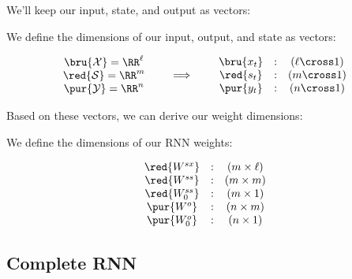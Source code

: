         We'll keep our input, state, and output as vectors:\\

        \begin{definition}
            We define the dimensions of our input, output, and state as vectors:

            \begin{equation*}
                \begin{matrix}
                    \bru{\mathcal{X}} = \RR^\ell \\
                    \red{\mathcal{S}} = \RR^m    \\
                    \pur{\mathcal{Y}} = \RR^n
                \end{matrix}
                \qquad\implies\qquad 
                \begin{matrix}
                    \bru{x_t} &:& (\ell \cross 1) \\
                    \red{s_t} &:& (m \cross 1)    \\
                    \pur{y_t} &:& (n \cross 1)
                \end{matrix}
            \end{equation*} 
        \end{definition}

        Based on these vectors, we can derive our weight dimensions:\\

        \begin{definition}
            We define the dimensions of our RNN weights:

            \begin{equation*}
                \begin{matrix}
                    \red{W^{sx}} &:& (m \times \ell) \\
                    \red{W^{ss}} &:& (m \times m) \\
                    \red{W^{ss}_0} &:& (m \times 1) \\
                    \pur{W^{o}} &:& (n \times m)\\
                    \pur{W^{o}_0} &:& (n \times 1)
                \end{matrix}
            \end{equation*} 
        \end{definition}



    \pagebreak

    \subsection{Complete RNN}

